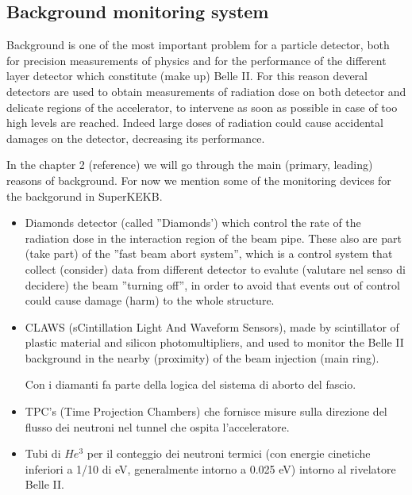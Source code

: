 




\subsection{Background monitoring system}

Background is one of the most important problem for a particle detector, both for precision measurements of physics and for the performance of the different layer detector which constitute (make up) Belle II. For this reason deveral detectors are used to obtain measurements of radiation dose on both detector and delicate regions of the accelerator, to intervene as soon as possible in case of too high levels are reached. Indeed large doses of radiation could cause accidental damages on the detector, decreasing its performance.

In the chapter 2 (reference) we will go through the main (primary, leading) reasons of background. For now we mention some of the monitoring devices for the backgorund in SuperKEKB.


\begin{itemize}
\item Diamonds detector (called ''Diamonds') which control the rate of the radiation dose in the interaction region of the beam pipe. These also are part (take part) of the ''fast beam abort system'', which is a control system that collect (consider) data from different detector to evalute (valutare nel senso di decidere) the beam ''turning off'', in order to avoid that events out of control could cause damage (harm) to the whole structure.
\item CLAWS (sCintillation Light And Waveform Sensors), made by scintillator of plastic material and silicon photomultipliers, and used to monitor the Belle II background in the nearby (proximity) of the beam injection (main ring).

 Con i diamanti fa parte della logica del sistema di aborto del fascio.
\item TPC's (Time Projection Chambers) che fornisce misure sulla direzione del flusso dei neutroni nel tunnel che ospita l'acceleratore.
\item Tubi di $He^{3}$ per il conteggio dei neutroni termici (con energie cinetiche inferiori a 1/10 di eV, generalmente intorno a 0.025 eV) intorno al rivelatore Belle II.
\end{itemize}


